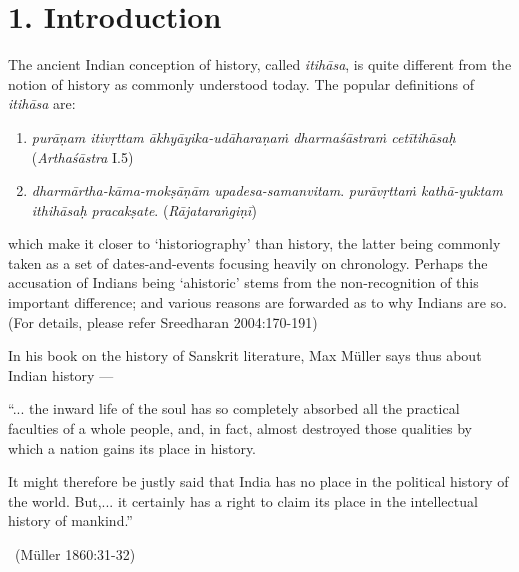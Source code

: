 \section*{1. Introduction}

The ancient Indian conception of history, called \textit{itihāsa}, is quite different from the notion of history as commonly understood today. The popular definitions of \textit{itihāsa} are:

\begin{enumerate}
\itemsep=0pt
\item \textit{purāṇam itivṛttam ākhyāyika-udāharaṇaṁ dharmaśāstraṁ cetītihāsaḥ} (\textit{Arthaśāstra} I.5)

 \item 
 \textit{dharmārtha-kāma-mokṣāṇām upadesa-samanvitam}.\hfill\break
 \textit{purāvṛttaṁ kathā-yuktam ithihāsaḥ pracakṣate}. (\textit{Rājataraṅgiṇī})

\end{enumerate}

which make it closer to ‘historiography’ than history, the latter being commonly taken as a set of dates-and-events focusing heavily on chronology. Perhaps the accusation of Indians being ‘ahistoric’ stems from the non-recognition of this important difference; and various reasons are forwarded as to why Indians are so. (For details, please refer Sreedharan 2004:170-191)

In his book on the history of Sanskrit literature, Max Müller says thus about Indian history —

\begin{myquote}
“... the inward life of the soul has so completely absorbed all the practical faculties of a whole people, and, in fact, almost destroyed those qualities by which a nation gains its place in history.
\end{myquote}

\begin{myquote}
It might therefore be justly said that India has no place in the political history of the world. But,... it certainly has a right to claim its place in the intellectual history of mankind.” 

~\hfill (Müller 1860:31-32)
\end{myquote}

